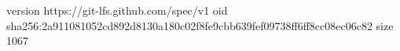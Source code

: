 version https://git-lfs.github.com/spec/v1
oid sha256:2a911081052cd892d8130a180c02f8fe9cbb639fef09738ff6ff8cc08ec06c82
size 1067
